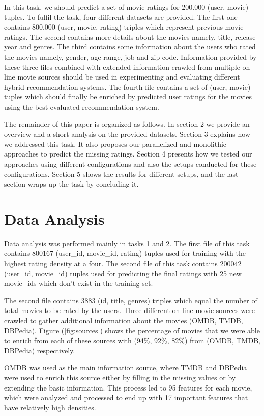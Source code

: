 \documentclass{sigish}
\begin{document}
In this task, we should predict a set of movie ratings for 200.000 (user, movie) tuples. To fulfil the task, four different datasets are provided. The first one contains 800.000 (user, movie, rating) triples which represent previous movie ratings. The second contains more details about the movies namely, title, release year and genres. The third contains some information about the users who rated the movies namely, gender, age range, job and zip-code. Information provided by these three files combined with extended information crawled from multiple on-line movie sources should be used in experimenting and evaluating different hybrid recommendation systems. The fourth file contains a set of (user, movie) tuples which should finally be enriched by predicted user ratings for the movies using the best evaluated recommendation system.

The remainder of this paper is organized as follows. In section 2 we provide an overview and a short analysis on the provided datasets. Section 3 explains how we addressed this task. It also proposes our parallelized and monolithic approaches to predict the missing ratings. Section 4 presents how we tested our approaches using different configurations and also the setups conducted for these configurations. Section 5 shows the results for different setups, and the last section wraps up the task by concluding it.

\section{Data Analysis}

Data analysis was performed mainly in tasks 1 and 2. The first file of this task contains 800167 (user\_id, movie\_id, rating) tuples used for training with the highest rating density at a four. The second file of this task contains 200042 (user\_id, movie\_id) tuples used for predicting the final ratings with 25 new movie\_ids which don't exist in the training set.

The second file contains 3883 (id, title, genres) triples which equal the number of total movies to be rated by the users. Three different on-line movie sources were crawled to gather additional information about the movies (OMDB, TMDB, DBPedia). Figure (\ref{fig:sources}) shows the percentage of movies that we were able to enrich from each of these sources with (94\%, 92\%, 82\%) from (OMDB, TMDB, DBPedia) respectively.

OMDB was used as the main information source, where TMDB and DBPedia were used to enrich this source either by filling in the missing values or by extending the basic information. This process led to 95 features for each movie, which were analyzed and processed to end up with 17 important features that have relatively high densities.
\end{document}
